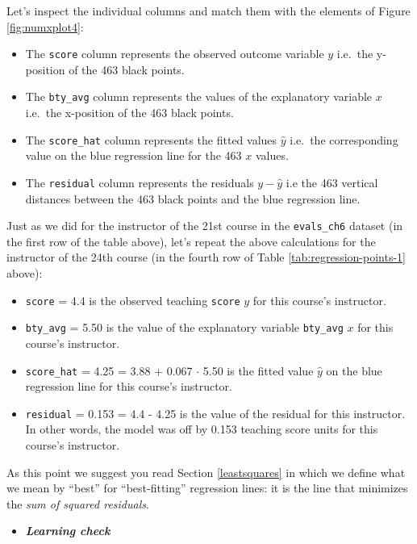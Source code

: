 \documentclass[12pt, krantz2,]{krantz}
\providecommand{\tightlist}{%
  \setlength{\itemsep}{0pt}\setlength{\parskip}{0pt}}
\newenvironment{rmdblock}[1]
  {\begin{shaded*}
  \begin{itemize}
  \renewcommand{\labelitemi}{
    \raisebox{-.7\height}[0pt][0pt]{
    }
  }
  \item
  }
  {
  \end{itemize}
  \end{shaded*}
  }
\newenvironment{learncheck}
  {\begin{rmdblock}{warning}}
  {\end{rmdblock}}
\begin{document}
Let's inspect the individual columns and match them with the elements of Figure \ref{fig:numxplot4}:

\begin{itemize}
\tightlist
\item
  The \texttt{score} column represents the observed outcome variable \(y\) i.e.~the y-position of the 463 black points.
\item
  The \texttt{bty\_avg} column represents the values of the explanatory variable \(x\) i.e.~the x-position of the 463 black points.
\item
  The \texttt{score\_hat} column represents the fitted values \(\widehat{y}\) i.e.~the corresponding value on the blue regression line for the 463 \(x\) values.
\item
  The \texttt{residual} column represents the residuals \(y - \widehat{y}\) i.e the 463 vertical distances between the 463 black points and the blue regression line.
\end{itemize}

Just as we did for the instructor of the 21st course in the \texttt{evals\_ch6} dataset (in the first row of the table above), let's repeat the above calculations for the instructor of the 24th course (in the fourth row of Table \ref{tab:regression-points-1} above):

\begin{itemize}
\tightlist
\item
  \texttt{score} = 4.4 is the observed teaching \texttt{score} \(y\) for this course's instructor.
\item
  \texttt{bty\_avg} = 5.50 is the value of the explanatory variable \texttt{bty\_avg} \(x\) for this course's instructor.
\item
  \texttt{score\_hat} = 4.25 = 3.88 + 0.067 \(\cdot\) 5.50 is the fitted value \(\widehat{y}\) on the blue regression line for this course's instructor.
\item
  \texttt{residual} = 0.153 = 4.4 - 4.25 is the value of the residual for this instructor. In other words, the model was off by 0.153 teaching score units for this course's instructor.
\end{itemize}

As this point we suggest you read Section \ref{leastsquares} in which we define what we mean by ``best'' for ``best-fitting'' regression lines: it is the line that minimizes the \emph{sum of squared residuals}.

\begin{learncheck}
\textbf{\emph{Learning check}}
\end{learncheck}
\end{document}
